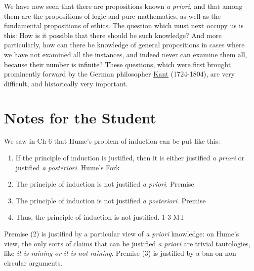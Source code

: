 \documentclass[oneside,letterpaper,12pt]{book}
\begin{document}
We have now seen that there are propositions known \emph{a priori}, and
that among them are the propositions of logic and pure mathematics, as
well as the fundamental propositions of ethics. The question which must
next occupy us is this: How is it possible that there should be such
knowledge? And more particularly, how can there be knowledge of general
propositions in cases where we have not examined all the instances, and
indeed never can examine them all, because their number is infinite?
These questions, which were first brought prominently forward by the
German philosopher \href{https://plato.stanford.edu/entries/kant/}{Kant} 
(1724-1804), are very difficult, and historically very important.

\protect\hypertarget{link2HCH0008}{}{}

\pagebreak

\section{Notes for the Student}
We saw in Ch 6 that Hume's problem of induction can be put like this:
\begin{enumerate}
	\item If the principle of induction is justified, then it is either justified \textit{a priori} or justified \textit{a posteriori}. \hfill Hume's Fork
	\item The principle of induction is not justified \textit{a priori}. \hfill Premise
	\item The principle of induction is not justified \textit{a posteriori}. \hfill Premise
	\item Thus, the principle of induction is not justified. \hfill 1-3 MT
\end{enumerate}
Premise (2) is justified by a particular view of \textit{a priori} knowledge: on Hume's view, the only sorts of claims that can be justified \textit{a priori} are trivial tautologies, like \textit{it is raining or it is not raining}. Premise (3) is justified by a ban on non-circular arguments.
\end{document}
